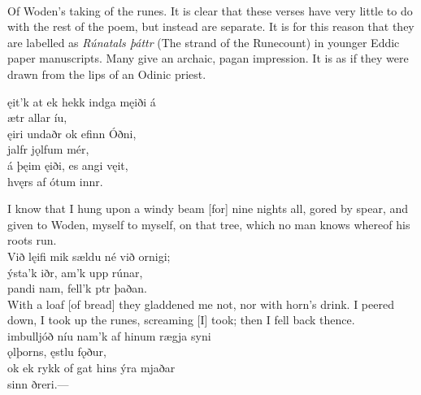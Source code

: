  \\

Of Woden's taking of the runes.
It is clear that these verses have very little to do with the rest of the poem, but instead are separate. It is for this reason that they are labelled as \emph{Rúnatals þáttr} (The strand of the Runecount) in younger Eddic paper manuscripts. Many give an archaic, pagan impression. It is as if they were drawn from the lips of an Odinic priest.

\bva \footnotemark[2] ęit'k at ek hekk \hld {}indga męiði á \\%
\ind {}ætr allar íu, \\%
ęiri undaðr \hld ok efinn Óðni, \\%
\ind {}jalfr jǫlfum mér, \\%
á þęim ęiði, \hld es angi vęit, \\%
\ind hvęrs af ótum innr\footnotemark[3].\\%

\bvb I know that I hung upon a windy beam [for] nine nights all, gored by spear, and given to Woden, myself to myself, on that tree, which no man knows whereof his roots run. \\

\bva Við lęifi mik sældu \hld né við ornigi; \\%
ýsta'k iðr, \hld {}am'k upp rúnar, \\%
pandi nam, \hld fell'k ptr þaðan.\\%

\bvb With a loaf [of bread] they gladdened me not, nor with horn's drink. I peered down, I took up the runes, screaming [I] took; then I fell back thence. \\

\bva {}imbulljóð níu \hld nam'k af hinum rægja syni \\%
\ind {}ǫlþorns, ęstlu fǫður, \\%
ok ek rykk of gat \hld hins ýra mjaðar \\%
\ind {}sinn ðreri.\footnotemark[1] —\\%

